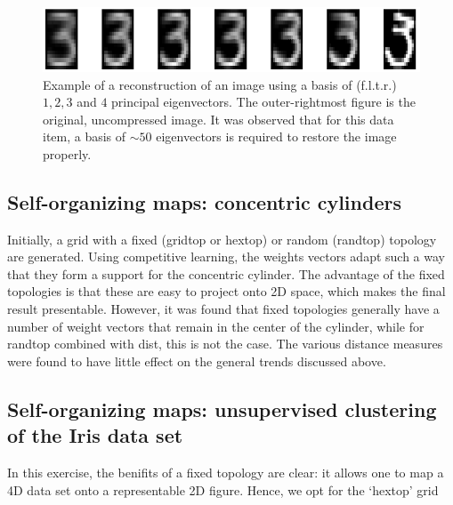 \documentclass[pdftex,11pt,a4paper]{article}
\begin{document}
\begin{figure}[htb]
\centering
\includegraphics[width=\textwidth]{figs/reconstruction_steps.png}
\caption{Example of a reconstruction of an image using a basis of (f.l.t.r.) $1,2,3$ and $4$ principal eigenvectors. The outer-rightmost figure is the original, uncompressed image. It was observed that for this data item, a basis of $\sim 50$ eigenvectors is required to restore the image properly.\label{fig:reconstruction_example}}
\end{figure}

\subsection{Self-organizing maps: concentric cylinders}
Initially, a grid with a fixed (gridtop or hextop) or random (randtop) topology are generated. Using competitive learning, the weights vectors adapt such a way that they form a support for the concentric cylinder. The advantage of the fixed topologies is that these are easy to project onto 2D space, which makes the final result presentable. However, it was found that fixed topologies generally have a number of weight vectors that remain in the center of the cylinder, while for randtop combined with dist, this is not the case. The various distance measures were found to have little effect on the general trends discussed above.

\subsection{Self-organizing maps: unsupervised clustering of the Iris data set}
In this exercise, the benifits of a fixed topology are clear: it allows one to map a 4D data set onto a representable 2D figure. Hence, we opt for the `hextop' grid
\end{document}
